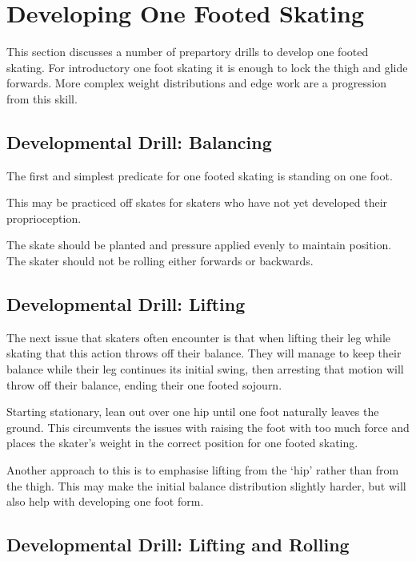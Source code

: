 \section{Developing One Footed Skating}
\label{sec:one_foot/development}


This section discusses a number of prepartory drills to develop one footed skating. 
For introductory one foot skating it is enough to lock the thigh and glide forwards.
More complex weight distributions and edge work are a progression from this skill.     


\subsection*{Developmental Drill: Balancing}
The first and simplest predicate for one footed skating is standing on one foot. 

This may be practiced off skates for skaters who have not yet developed their proprioception.    

The skate should be planted and pressure applied evenly to maintain position.   
The skater should not be rolling either forwards or backwards.

\subsection*{Developmental Drill: Lifting}
The next issue that skaters often encounter is that when lifting their leg while skating that this action throws off their balance.
They will manage to keep their balance while their leg continues its initial swing, then arresting that motion will throw off their balance, ending their one footed sojourn.  


Starting stationary, lean out over one hip until one foot naturally leaves the ground.
This circumvents the issues with raising the foot with too much force and places the skater's weight in the correct position for one footed skating.    



Another approach to this is to emphasise lifting from the `hip' rather than from the thigh.
This may make the initial balance distribution slightly harder, but will also help with developing one foot form.


\subsection*{Developmental Drill: Lifting and Rolling}
 

